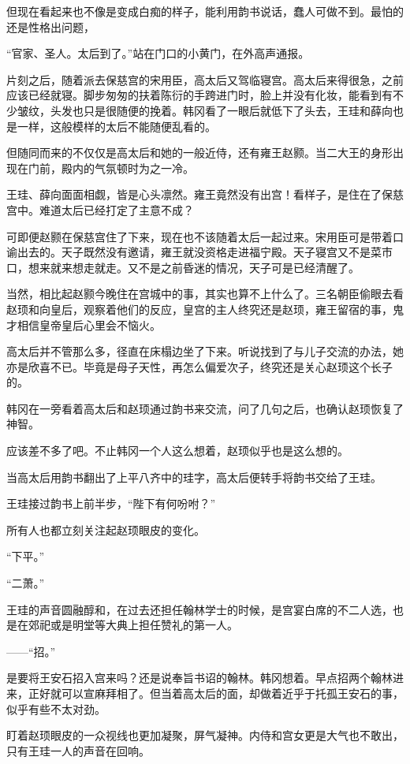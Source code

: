 但现在看起来也不像是变成白痴的样子，能利用韵书说话，蠢人可做不到。最怕的还是性格出问题，

“官家、圣人。太后到了。”站在门口的小黄门，在外高声通报。

片刻之后，随着派去保慈宫的宋用臣，高太后又驾临寝宫。高太后来得很急，之前应该已经就寝。脚步匆匆的扶着陈衍的手跨进门时，脸上并没有化妆，能看到有不少皱纹，头发也只是很随便的挽着。韩冈看了一眼后就低下了头去，王珪和薛向也是一样，这般模样的太后不能随便乱看的。

但随同而来的不仅仅是高太后和她的一般近侍，还有雍王赵颢。当二大王的身形出现在门前，殿内的气氛顿时为之一冷。

王珪、薛向面面相觑，皆是心头凛然。雍王竟然没有出宫！看样子，是住在了保慈宫中。难道太后已经打定了主意不成？

可即便赵颢在保慈宫住了下来，现在也不该随着太后一起过来。宋用臣可是带着口谕出去的。天子既然没有邀请，雍王就没资格走进福宁殿。天子寝宫又不是菜市口，想来就来想走就走。又不是之前昏迷的情况，天子可是已经清醒了。

当然，相比起赵颢今晚住在宫城中的事，其实也算不上什么了。三名朝臣偷眼去看赵顼和向皇后，观察着他们的反应，皇宫的主人终究还是赵顼，雍王留宿的事，鬼才相信皇帝皇后心里会不恼火。

高太后并不管那么多，径直在床榻边坐了下来。听说找到了与儿子交流的办法，她亦是欣喜不已。毕竟是母子天性，再怎么偏爱次子，终究还是关心赵顼这个长子的。

韩冈在一旁看着高太后和赵顼通过韵书来交流，问了几句之后，也确认赵顼恢复了神智。

应该差不多了吧。不止韩冈一个人这么想着，赵顼似乎也是这么想的。

当高太后用韵书翻出了上平八齐中的珪字，高太后便转手将韵书交给了王珪。

王珪接过韵书上前半步，“陛下有何吩咐？”

所有人也都立刻关注起赵顼眼皮的变化。

“下平。”

“二萧。”

王珪的声音圆融醇和，在过去还担任翰林学士的时候，是宫宴白席的不二人选，也是在郊祀或是明堂等大典上担任赞礼的第一人。

——“招。”

是要将王安石招入宫来吗？还是说奉旨书诏的翰林。韩冈想着。早点招两个翰林进来，正好就可以宣麻拜相了。但当着高太后的面，却做着近乎于托孤王安石的事，似乎有些不太对劲。

盯着赵顼眼皮的一众视线也更加凝聚，屏气凝神。内侍和宫女更是大气也不敢出，只有王珪一人的声音在回响。

